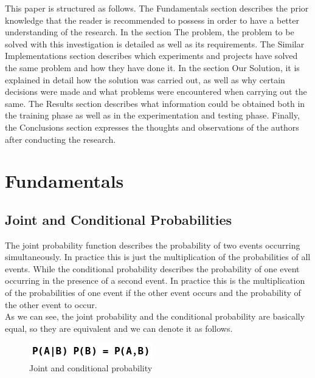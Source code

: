 \documentclass[sigconf,12pt,review=false,natbib=false]{acmart}
\begin{document}
This paper is structured as follows. The Fundamentals section describes the prior knowledge that the
reader is recommended to possess in order to have a better understanding of the research. In the
section The problem, the problem to be solved with this investigation is detailed as well as its
requirements. The Similar Implementations section describes which experiments and projects have
solved the same problem and how they have done it. In the section Our Solution, it is explained in
detail how the solution was carried out, as well as why certain decisions were made and what problems
were encountered when carrying out the same. The Results section describes what information could be
obtained both in the training phase as well as in the experimentation and testing phase. Finally, the
Conclusions section expresses the thoughts and observations of the authors after conducting the
research. \\

\section{Fundamentals}

\subsection{Joint and Conditional Probabilities}

The joint probability function describes the probability of two events occurring simultaneously. In
practice this is just the multiplication of the probabilities of all events. While the conditional
probability describes the probability of one event occurring in the presence of a second event. In
practice this is the multiplication of the probabilities of one event if the other event occurs and
the probability of the other event to occur. \\

As we can see, the joint probability and the conditional probability are basically equal, so they are
equivalent and we can denote it as follows.

\begin{figure}[h!]
    \centering
    \includegraphics[]{jcp_relationship}
    \caption{Joint and conditional probability}
    \label{fig:jcp_relationship}
\end{figure}
\end{document}
